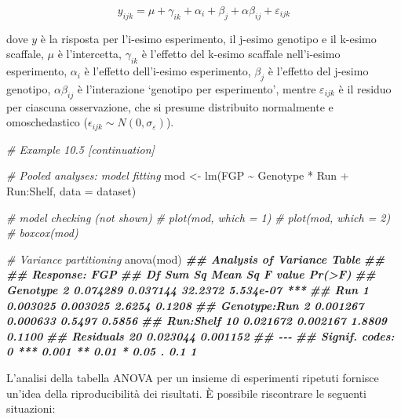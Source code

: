 \documentclass[
  12pt,
]{book}
\newenvironment{Shaded}{\begin{snugshade}}{\end{snugshade}}
\newcommand{\AttributeTok}[1]{\textcolor[rgb]{0.77,0.63,0.00}{#1}}
\newcommand{\CommentTok}[1]{\textcolor[rgb]{0.56,0.35,0.01}{\textit{#1}}}
\newcommand{\DocumentationTok}[1]{\textcolor[rgb]{0.56,0.35,0.01}{\textbf{\textit{#1}}}}
\newcommand{\FunctionTok}[1]{\textcolor[rgb]{0.00,0.00,0.00}{#1}}
\newcommand{\NormalTok}[1]{#1}
\newcommand{\OtherTok}[1]{\textcolor[rgb]{0.56,0.35,0.01}{#1}}
\newcommand{\SpecialCharTok}[1]{\textcolor[rgb]{0.00,0.00,0.00}{#1}}
\begin{document}
\[y_{ijk} = \mu + \gamma_{ik} + \alpha_i + \beta_j + \alpha\beta_{ij} + \varepsilon_{ijk}\]

dove \(y\) è la risposta per l'i-esimo esperimento, il j-esimo genotipo e il k-esimo scaffale, \(\mu\) è l'intercetta, \(\gamma_{ik}\) è l'effetto del k-esimo scaffale nell'i-esimo esperimento, \(\alpha_i\) è l'effetto dell'i-esimo esperimento, \(\beta_j\) è l'effetto del j-esimo genotipo, \(\alpha\beta_{ij}\) è l'interazione `genotipo per esperimento', mentre \(\varepsilon_{ijk}\) è il residuo per ciascuna osservazione, che si presume distribuito normalmente e omoschedastico (\(\epsilon_{ijk} \sim N(0, \sigma_{\varepsilon})\)).

\begin{Shaded}
\begin{Highlighting}[]
\CommentTok{\# Example 10.5 [continuation]}

\CommentTok{\# Pooled analyses: model fitting}
\NormalTok{mod }\OtherTok{\textless{}{-}} \FunctionTok{lm}\NormalTok{(FGP }\SpecialCharTok{\textasciitilde{}}\NormalTok{ Genotype }\SpecialCharTok{*}\NormalTok{ Run }\SpecialCharTok{+}\NormalTok{ Run}\SpecialCharTok{:}\NormalTok{Shelf, }\AttributeTok{data =}\NormalTok{ dataset)}

\CommentTok{\# model checking (not shown)}
\CommentTok{\# plot(mod, which = 1)}
\CommentTok{\# plot(mod, which = 2)}
\CommentTok{\# boxcox(mod)}

\CommentTok{\# Variance partitioning}
\FunctionTok{anova}\NormalTok{(mod)}
\DocumentationTok{\#\# Analysis of Variance Table}
\DocumentationTok{\#\# }
\DocumentationTok{\#\# Response: FGP}
\DocumentationTok{\#\#              Df   Sum Sq  Mean Sq F value    Pr(\textgreater{}F)    }
\DocumentationTok{\#\# Genotype      2 0.074289 0.037144 32.2372 5.534e{-}07 ***}
\DocumentationTok{\#\# Run           1 0.003025 0.003025  2.6254    0.1208    }
\DocumentationTok{\#\# Genotype:Run  2 0.001267 0.000633  0.5497    0.5856    }
\DocumentationTok{\#\# Run:Shelf    10 0.021672 0.002167  1.8809    0.1100    }
\DocumentationTok{\#\# Residuals    20 0.023044 0.001152                      }
\DocumentationTok{\#\# {-}{-}{-}}
\DocumentationTok{\#\# Signif. codes:  0 \textquotesingle{}***\textquotesingle{} 0.001 \textquotesingle{}**\textquotesingle{} 0.01 \textquotesingle{}*\textquotesingle{} 0.05 \textquotesingle{}.\textquotesingle{} 0.1 \textquotesingle{} \textquotesingle{} 1}
\end{Highlighting}
\end{Shaded}

L'analisi della tabella ANOVA per un insieme di esperimenti ripetuti fornisce un'idea della riproducibilità dei risultati. È possibile riscontrare le seguenti situazioni:
\end{document}
